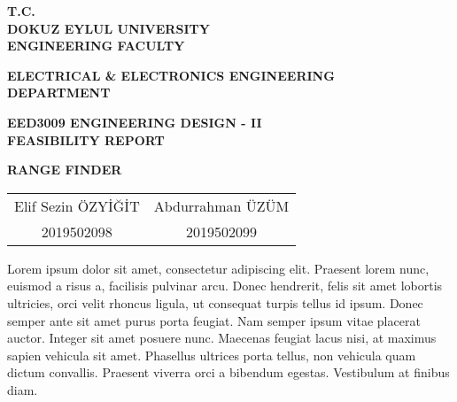 \documentclass[12pt, a4paper]{article}
\begin{document}
    \begin{titlepage}
        \begin{center}

            \vspace*{1 cm}
            \textbf{T.C.\\}
            \textbf{DOKUZ EYLUL UNIVERSITY\\}
            \textbf{ENGINEERING FACULTY\\}

            \vspace*{1 cm}
            \textbf{ELECTRICAL \& ELECTRONICS ENGINEERING\\}
            \textbf{DEPARTMENT\\}

            \vspace*{1 cm}
            \textbf{EED3009 ENGINEERING DESIGN - II\\}
            \textbf{FEASIBILITY REPORT\\}

            \textbf{RANGE FINDER}

            \begin{table}[H]
                \begin{tabular*}{\textwidth}{c c}
                    Elif Sezin ÖZYİĞİT  & Abdurrahman ÜZÜM \\
                    2019502098          & 2019502099                    
                \end{tabular*}
            \end{table}









        \end{center}
    \end{titlepage}



    Lorem ipsum dolor sit amet, consectetur adipiscing elit. Praesent lorem nunc, euismod a risus a,
    facilisis pulvinar arcu. Donec hendrerit, felis sit amet lobortis ultricies, orci velit rhoncus 
    ligula, ut consequat turpis tellus id ipsum. Donec semper ante sit amet purus porta feugiat. 
    Nam semper ipsum vitae placerat auctor. Integer sit amet posuere nunc. Maecenas feugiat lacus 
    nisi, at maximus sapien vehicula sit amet. Phasellus ultrices porta tellus, non vehicula quam 
    dictum convallis. Praesent viverra orci a bibendum egestas. Vestibulum at finibus diam.


    

    

    
\end{document}
